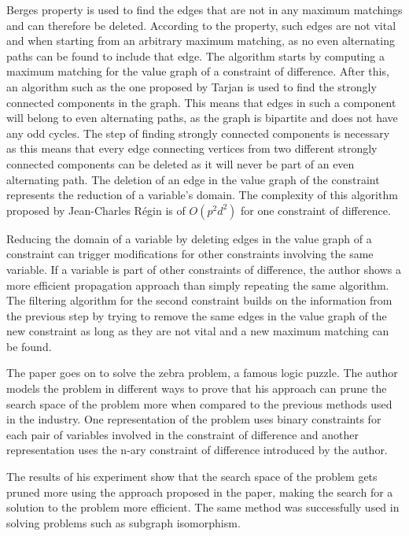 \documentclass{l4proj}
\begin{document}
\noindent Berge\textquotesingle s property \cite{berge1957two} is used to find the edges that are not in any maximum matchings and can therefore be deleted. According to the property, such edges are not vital and when starting from an arbitrary maximum matching, as no even alternating paths can be found to include that edge. The algorithm starts by computing a maximum matching for the value graph of a constraint of difference. After this, an algorithm such as the one proposed by Tarjan \cite{tarjan1972depth} is used to find the strongly connected components in the graph. This means that edges in such a component will belong to even alternating paths, as the graph is bipartite and does not have any odd cycles. The step of finding strongly connected components is necessary as this means that every edge connecting vertices from two different strongly connected components can be deleted as it will never be part of an even alternating path. The deletion of an edge in the value graph of the constraint represents the reduction of a variable's domain. The complexity of this algorithm proposed by Jean-Charles R\'egin \cite{regin1994filtering} is of $O(p^2d^2)$ for one constraint of difference.

\noindent Reducing the domain of a variable by deleting edges in the value graph of a constraint can trigger modifications for other constraints involving the same variable. If a variable is part of other constraints of difference, the author shows a more efficient propagation approach than simply repeating the same algorithm. The filtering algorithm for the second constraint builds on the information from the previous step by trying to remove the same edges in the value graph of the new constraint as long as they are not vital and a new maximum matching can be found.

\noindent The paper goes on to solve the zebra problem, a famous logic puzzle. The author models the problem in different ways to prove that his approach can prune the search space of the problem more when compared to the previous methods used in the industry. One representation of the problem uses binary constraints for each pair of variables involved in the constraint of difference and another representation uses the n-ary constraint of difference introduced by the author. 

\noindent The results of his experiment show that the search space of the problem gets pruned more using the approach proposed in the paper, making the search for a solution to the problem more efficient. The same method was successfully used in solving problems such as subgraph isomorphism.
\end{document}
